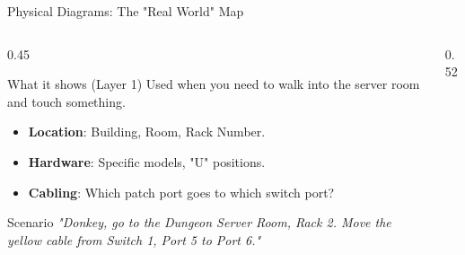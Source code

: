 \documentclass[aspectratio=169]{beamer}  %
\begin{document}
\begin{frame}{Physical Diagrams: The "Real World" Map}
    \begin{columns}[T]
        \begin{column}{0.45\textwidth}
            \begin{block}{What it shows (Layer 1)}
                \footnotesize
                Used when you need to walk into the server room and touch something.
                \begin{itemize}
                    \item \textbf{Location}: Building, Room, Rack Number.
                    \item \textbf{Hardware}: Specific models, "U" positions.
                    \item \textbf{Cabling}: Which patch port goes to which switch port?
                \end{itemize}
            \end{block}
            \begin{exampleblock}{Scenario}
                \footnotesize
                \textit{"Donkey, go to the Dungeon Server Room, Rack 2. Move the yellow cable from Switch 1, Port 5 to Port 6."}
            \end{exampleblock}
        \end{column}
        \begin{column}{0.52\textwidth}
            \begin{center}
\end{center}
\end{column}
\end{columns}
\end{frame}
\end{document}
